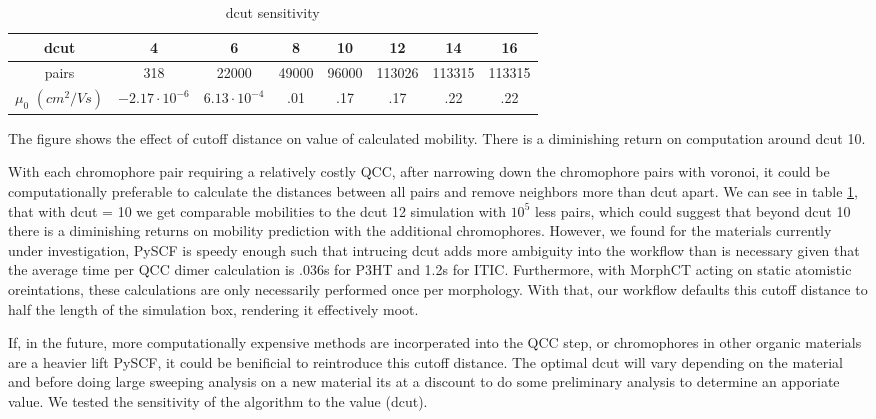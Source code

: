 \begin{table}[ht]
\caption{dcut sensitivity}
\centering %
\begin{tabular}{c c c c c c c c} %
\hline\hline %
dcut & 4 & 6 & 8 & 10 & 12 & 14 & 16 \\ [0.5ex] %
\hline  %
pairs & 318 & 22000 & 49000 & 96000 & 113026 & 113315 & 113315 \\ [1ex]%
$\mu_{0}$ $(cm^{2}/Vs)$ & $-2.17 \cdot 10^{-6}$ & $6.13 \cdot 10^{-4}$ & .01 & .17 & .17 & .22 & .22 \\ [1ex] %
\hline %
\end{tabular}
\label{table:dcut-sense} %
\end{table}

The figure shows the effect of cutoff distance on value of
calculated mobility. There is a diminishing return on computation around dcut 10. 

With each chromophore pair requiring a relatively costly QCC, after narrowing down the chromophore pairs with voronoi, it
could be
computationally preferable to calculate the distances between all pairs and remove neighbors more than dcut
apart. We can see in table \ref{table:dcut-sense}, that with dcut = 10 we get comparable mobilities to the
dcut 12 simulation with $10^5$ less
pairs, which could suggest that beyond dcut 10 there is a diminishing returns on mobility prediction with the
additional chromophores. However, we found for the materials currently under investigation, PySCF is speedy enough such that intrucing dcut adds more ambiguity
into the workflow than is necessary given that the average time per QCC dimer calculation is .036s for P3HT and
1.2s for ITIC. Furthermore, with MorphCT acting on static atomistic oreintations, these calculations 
are only necessarily performed once per morphology. With that, our workflow defaults this cutoff distance to half
the length of the simulation box, rendering it effectively moot. 

If, in the future, more computationally expensive methods are incorperated into the QCC step, or chromophores in other
organic materials are a heavier lift PySCF, it could be benificial to reintroduce this cutoff distance. The optimal dcut will vary depending on the material and before doing large sweeping analysis on a new
material its at a discount to do some preliminary analysis to determine an apporiate value. We tested the
sensitivity of the algorithm to the value (dcut). 

